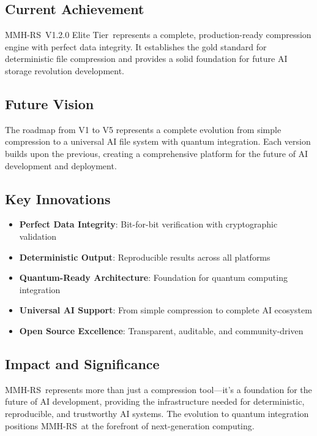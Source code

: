 \documentclass[12pt,a4paper]{article}
\newcommand{\version}{V1.2.0 Elite Tier}
\newcommand{\project}{MMH-RS}
\begin{document}
\subsection{Current Achievement}
\project\ \version\ represents a complete, production-ready compression engine with perfect data integrity. It establishes the gold standard for deterministic file compression and provides a solid foundation for future AI storage revolution development.

\subsection{Future Vision}
The roadmap from V1 to V5 represents a complete evolution from simple compression to a universal AI file system with quantum integration. Each version builds upon the previous, creating a comprehensive platform for the future of AI development and deployment.

\subsection{Key Innovations}
\begin{itemize}
    \item \textbf{Perfect Data Integrity}: Bit-for-bit verification with cryptographic validation
    \item \textbf{Deterministic Output}: Reproducible results across all platforms
    \item \textbf{Quantum-Ready Architecture}: Foundation for quantum computing integration
    \item \textbf{Universal AI Support}: From simple compression to complete AI ecosystem
    \item \textbf{Open Source Excellence}: Transparent, auditable, and community-driven
\end{itemize}

\subsection{Impact and Significance}
\project\ represents more than just a compression tool—it's a foundation for the future of AI development, providing the infrastructure needed for deterministic, reproducible, and trustworthy AI systems. The evolution to quantum integration positions \project\ at the forefront of next-generation computing.

\newpage

\appendix
\end{document}
